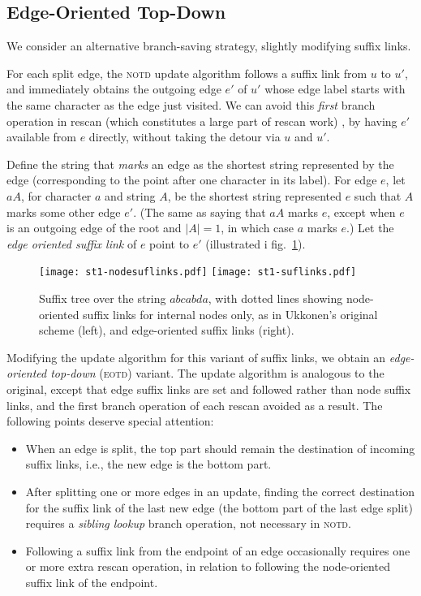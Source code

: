 \documentclass{llncs}
\newcommand\notd{\textsc{notd}\xspace}
\newcommand\eotd{\textsc{eotd}\xspace}
\begin{document}
\subsection{Edge-Oriented Top-Down}\label{sec-eotd}

We consider an alternative branch-saving strategy, slightly modifying
suffix links.

For each split edge, the \notd update algorithm follows a suffix link from
$u$ to $u'$, and immediately obtains the outgoing edge $e'$ of
$u'$ whose edge label starts with the same character as the edge just
visited. We can avoid this
\emph{first} branch operation in rescan (which constitutes a large part of
rescan work)
, by having $e'$ available from $e$ directly, without taking the detour via
$u$ and $u'$.

Define the string that \emph{marks} an edge as the shortest string represented
by the edge
(corresponding to the point after one character in its label). For edge $e$,
let $aA$, for character $a$ and string $A$, be the shortest string represented
$e$ such that $A$ marks some other edge $e'$. (The same as saying that $aA$
marks $e$, except when $e$ is an outgoing edge of the root and $|A|=1$, in
which case $a$ marks $e$.) Let the \emph{edge oriented suffix link} of $e$
point to $e'$ (illustrated i fig.~\ref{fig-st}).

\begin{figure}[t]
\begin{center}
\texttt{[image: st1-nodesuflinks.pdf]}
\hfil
\texttt{[image: st1-suflinks.pdf]}
\end{center}
\caption{\label{fig-st}Suffix tree over the string $abcabda$, with dotted lines
  showing node-oriented suffix links for internal nodes only, as in Ukkonen's
  original scheme (left), and
  edge-oriented suffix links (right).}
\end{figure}
 
\label{sec-siblinglookup}Modifying the update algorithm for this variant of suffix links, we obtain an
\emph{edge-oriented top-down} (\eotd) variant. The update algorithm is
analogous to the original, except that edge suffix links are set and followed
rather than node suffix links, and the first branch operation of each rescan
avoided as a result. The following points deserve special attention:
\begin{itemize}
\item When an edge is split, the top part should remain the destination of
  incoming suffix links, i.e., the new edge is the bottom part.
\item After splitting one or more edges in an update, finding the correct
  destination for the suffix link of the last new edge (the bottom part of the
  last edge split) requires a \emph{sibling lookup} branch operation, not
  necessary in \notd.
\item Following a suffix link from the endpoint of an edge occasionally
  requires one or more extra rescan operation, in relation to following the
  node-oriented suffix link of the endpoint.
\end{itemize}
\end{document}
